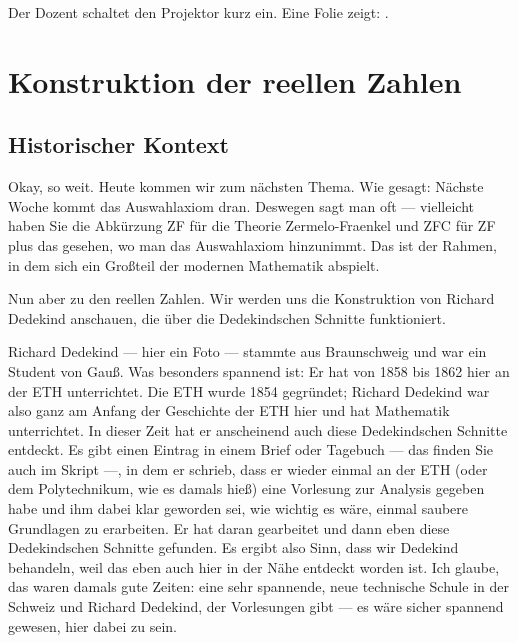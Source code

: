 \begin{meta-note}
Der Dozent schaltet den Projektor kurz ein. Eine Folie zeigt: .
\end{meta-note}

\section{Konstruktion der reellen Zahlen}

\subsection{Historischer Kontext}

\begin{spoken-clean}[00:09:01 - 00:11:09]
Okay, so weit. Heute kommen wir zum nächsten Thema. Wie gesagt: Nächste Woche kommt das Auswahlaxiom dran. Deswegen sagt man oft  --- vielleicht haben Sie die Abkürzung ZF für die Theorie Zermelo-Fraenkel und ZFC für ZF plus das  gesehen, wo man das Auswahlaxiom hinzunimmt. Das ist der Rahmen, in dem sich ein Großteil der modernen Mathematik abspielt.

Nun aber zu den reellen Zahlen. Wir werden uns die Konstruktion von Richard Dedekind anschauen, die über die Dedekindschen Schnitte funktioniert.

Richard Dedekind --- hier ein Foto --- stammte aus Braunschweig und war ein Student von Gauß. Was besonders spannend ist: Er hat von 1858 bis 1862 hier an der ETH unterrichtet. Die ETH wurde 1854 gegründet; Richard Dedekind war also ganz am Anfang der Geschichte der ETH hier und hat Mathematik unterrichtet. In dieser Zeit hat er anscheinend auch diese Dedekindschen Schnitte entdeckt. Es gibt einen Eintrag in einem Brief oder Tagebuch --- das finden Sie auch im Skript ---, in dem er schrieb, dass er wieder einmal an der ETH (oder dem Polytechnikum, wie es damals hieß) eine Vorlesung zur Analysis gegeben habe und ihm dabei klar geworden sei, wie wichtig es wäre, einmal saubere Grundlagen zu erarbeiten. Er hat daran gearbeitet und dann eben diese Dedekindschen Schnitte gefunden. Es ergibt also Sinn, dass wir Dedekind behandeln, weil das eben auch hier in der Nähe entdeckt worden ist. Ich glaube, das waren damals gute Zeiten: eine sehr spannende, neue technische Schule in der Schweiz und Richard Dedekind, der Vorlesungen gibt --- es wäre sicher spannend gewesen, hier dabei zu sein.
\end{spoken-clean}

